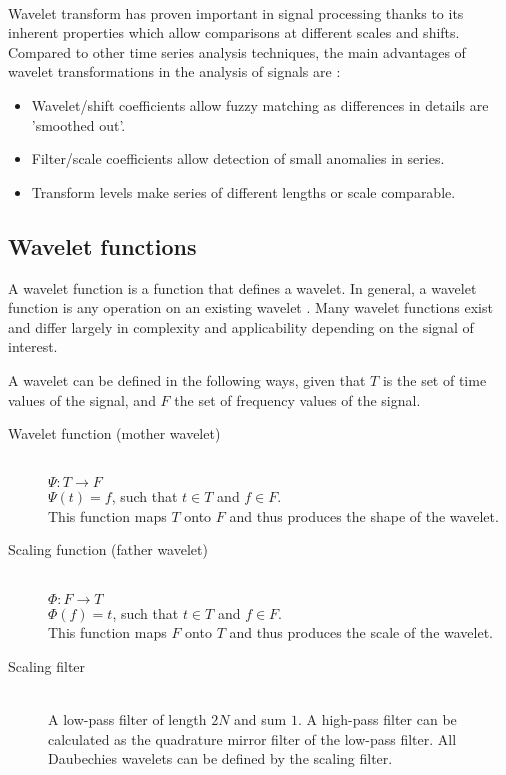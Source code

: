 \paragraph{}
Wavelet transform has proven important in signal processing thanks to its
inherent properties which allow comparisons at different scales and shifts.
Compared to other time series analysis techniques, the main advantages of
wavelet transformations in the analysis of signals are \cite{karus2013}:
\begin{itemize}
	\item Wavelet/shift coefficients allow fuzzy matching as differences in details
	are 'smoothed out'.
	\item Filter/scale coefficients allow detection of small anomalies in series.
	\item Transform levels make series of different lengths or scale comparable.
\end{itemize}

\subsection{Wavelet functions}
A wavelet function is a function that defines a wavelet. In general, a wavelet
function is any operation on an existing wavelet \cite{wadkar}. Many wavelet
functions exist and differ largely in complexity and applicability depending on
the signal of interest.

A wavelet can be defined in the following ways, given that $T$ is the set of
time values of the signal, and $F$ the set of frequency values of the signal.
\begin{description}
	\item[Wavelet function (mother wavelet)] \hfill \\ $\Psi: T \rightarrow
	F$\\ $\Psi(t) = f$, such that $t \in T$ and $f \in F$.\\
	This function maps $T$ onto $F$ and thus produces the shape of the wavelet.

	\item[Scaling function (father wavelet)] \hfill \\ $\Phi: F \rightarrow
	T$\\ $\Phi(f) = t$, such that $t \in T$ and $f \in F$.\\
	This function maps $F$ onto $T$ and thus produces the scale of the wavelet.

	\item[Scaling filter] \hfill \\ A low-pass filter of length $2N$ and sum $1$.
	A high-pass filter can be calculated as the quadrature mirror filter of the
	low-pass filter. All Daubechies wavelets can be defined by the scaling filter.
\end{description}

